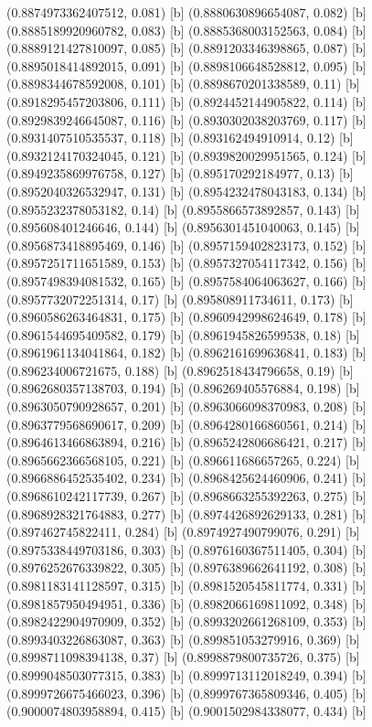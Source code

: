 {{{(0.8874973362407512, 0.081) [b] 
(0.8880630896654087, 0.082) [b] 
(0.8885189920960782, 0.083) [b] 
(0.8885368003152563, 0.084) [b] 
(0.8889121427810097, 0.085) [b] 
(0.8891203346398865, 0.087) [b] 
(0.8895018414892015, 0.091) [b] 
(0.8898106648528812, 0.095) [b] 
(0.8898344678592008, 0.101) [b] 
(0.8898670201338589, 0.11) [b] 
(0.8918295457203806, 0.111) [b] 
(0.8924452144905822, 0.114) [b] 
(0.8929839246645087, 0.116) [b] 
(0.8930302038203769, 0.117) [b] 
(0.8931407510535537, 0.118) [b] 
(0.893162494910914, 0.12) [b] 
(0.8932124170324045, 0.121) [b] 
(0.8939820029951565, 0.124) [b] 
(0.8949235869976758, 0.127) [b] 
(0.895170292184977, 0.13) [b] 
(0.8952040326532947, 0.131) [b] 
(0.8954232478043183, 0.134) [b] 
(0.8955232378053182, 0.14) [b] 
(0.8955866573892857, 0.143) [b] 
(0.895608401246646, 0.144) [b] 
(0.8956301451040063, 0.145) [b] 
(0.8956873418895469, 0.146) [b] 
(0.8957159402823173, 0.152) [b] 
(0.8957251711651589, 0.153) [b] 
(0.8957327054117342, 0.156) [b] 
(0.8957498394081532, 0.165) [b] 
(0.8957584064063627, 0.166) [b] 
(0.8957732072251314, 0.17) [b] 
(0.895808911734611, 0.173) [b] 
(0.8960586263464831, 0.175) [b] 
(0.8960942998624649, 0.178) [b] 
(0.8961544695409582, 0.179) [b] 
(0.8961945826599538, 0.18) [b] 
(0.8961961134041864, 0.182) [b] 
(0.8962161699636841, 0.183) [b] 
(0.896234006721675, 0.188) [b] 
(0.8962518434796658, 0.19) [b] 
(0.8962680357138703, 0.194) [b] 
(0.896269405576884, 0.198) [b] 
(0.8963050790928657, 0.201) [b] 
(0.8963066098370983, 0.208) [b] 
(0.8963779568690617, 0.209) [b] 
(0.8964280166860561, 0.214) [b] 
(0.8964613466863894, 0.216) [b] 
(0.8965242806686421, 0.217) [b] 
(0.8965662366568105, 0.221) [b] 
(0.896611686657265, 0.224) [b] 
(0.8966886452535402, 0.234) [b] 
(0.8968425624460906, 0.241) [b] 
(0.8968610242117739, 0.267) [b] 
(0.8968663255392263, 0.275) [b] 
(0.8968928321764883, 0.277) [b] 
(0.8974426892629133, 0.281) [b] 
(0.897462745822411, 0.284) [b] 
(0.8974927490799076, 0.291) [b] 
(0.8975338449703186, 0.303) [b] 
(0.8976160367511405, 0.304) [b] 
(0.8976252676339822, 0.305) [b] 
(0.8976389662641192, 0.308) [b] 
(0.8981183141128597, 0.315) [b] 
(0.8981520545811774, 0.331) [b] 
(0.8981857950494951, 0.336) [b] 
(0.8982066169811092, 0.348) [b] 
(0.8982422904970909, 0.352) [b] 
(0.8993202661268109, 0.353) [b] 
(0.8993403226863087, 0.363) [b] 
(0.899851053279916, 0.369) [b] 
(0.8998711098394138, 0.37) [b] 
(0.8998879800735726, 0.375) [b] 
(0.8999048503077315, 0.383) [b] 
(0.8999713112018249, 0.394) [b] 
(0.8999726675466023, 0.396) [b] 
(0.8999767365809346, 0.405) [b] 
(0.9000074803958894, 0.415) [b] 
(0.9001502984338077, 0.434) [b] 
}}}
